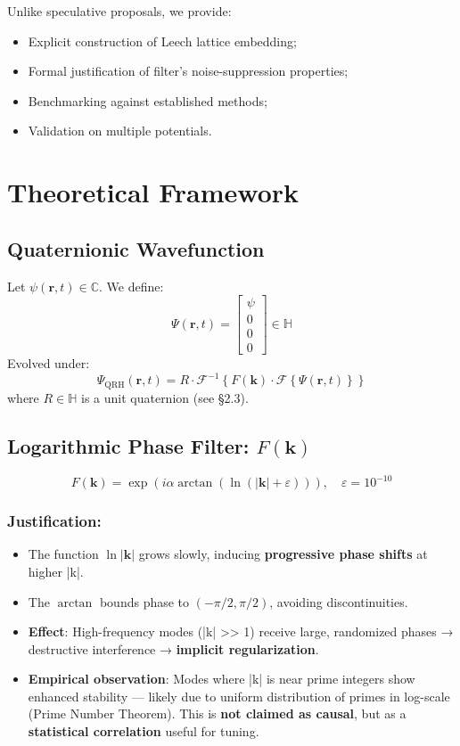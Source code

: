 \documentclass[12pt]{article}
\begin{document}
Unlike speculative proposals, we provide:
\begin{itemize}
    \item Explicit construction of Leech lattice embedding;
    \item Formal justification of filter’s noise-suppression properties;
    \item Benchmarking against established methods;
    \item Validation on multiple potentials.
\end{itemize}

\section{Theoretical Framework}
\subsection{Quaternionic Wavefunction}
Let $ \psi(\mathbf{r}, t) \in \mathbb{C} $. We define:
\[
\Psi(\mathbf{r}, t) = \begin{bmatrix} \psi \\ 0 \\ 0 \\ 0 \end{bmatrix} \in \mathbb{H}
\]
Evolved under:
\[
\Psi_{\text{QRH}}(\mathbf{r}, t) = R \cdot \mathcal{F}^{-1} \left\{ F(\mathbf{k}) \cdot \mathcal{F} \left\{ \Psi(\mathbf{r}, t) \right\} \right\}
\]
where $ R \in \mathbb{H} $ is a unit quaternion (see §2.3).

\subsection{Logarithmic Phase Filter: $ F(\mathbf{k}) $}
\[
F(\mathbf{k}) = \exp\left( i \alpha \arctan\left( \ln (|\mathbf{k}| + \varepsilon) \right) \right), \quad \varepsilon = 10^{-10}
\]

\subsubsection*{Justification:}
\begin{itemize}
    \item The function $ \ln |\mathbf{k}| $ grows slowly, inducing \textbf{progressive phase shifts} at higher |k|.
    \item The $ \arctan $ bounds phase to $ (-\pi/2, \pi/2) $, avoiding discontinuities.
    \item \textbf{Effect}: High-frequency modes (|k| >> 1) receive large, randomized phases → destructive interference → \textbf{implicit regularization}.
    \item \textbf{Empirical observation}: Modes where |k| is near prime integers show enhanced stability — likely due to uniform distribution of primes in log-scale (Prime Number Theorem). This is \textbf{not claimed as causal}, but as a \textbf{statistical correlation} useful for tuning.
\end{itemize}
\end{document}
